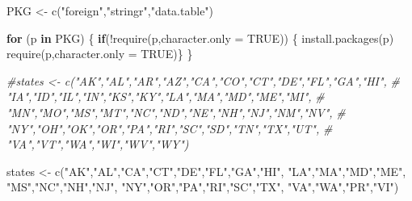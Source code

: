 \documentclass[
]{book}
\newenvironment{Shaded}{\begin{snugshade}}{\end{snugshade}}
\newcommand{\AttributeTok}[1]{\textcolor[rgb]{0.77,0.63,0.00}{#1}}
\newcommand{\CommentTok}[1]{\textcolor[rgb]{0.56,0.35,0.01}{\textit{#1}}}
\newcommand{\ConstantTok}[1]{\textcolor[rgb]{0.00,0.00,0.00}{#1}}
\newcommand{\ControlFlowTok}[1]{\textcolor[rgb]{0.13,0.29,0.53}{\textbf{#1}}}
\newcommand{\FunctionTok}[1]{\textcolor[rgb]{0.00,0.00,0.00}{#1}}
\newcommand{\NormalTok}[1]{#1}
\newcommand{\OtherTok}[1]{\textcolor[rgb]{0.56,0.35,0.01}{#1}}
\newcommand{\SpecialCharTok}[1]{\textcolor[rgb]{0.00,0.00,0.00}{#1}}
\newcommand{\StringTok}[1]{\textcolor[rgb]{0.31,0.60,0.02}{#1}}
\begin{document}
\begin{Shaded}
\begin{Highlighting}[]
\NormalTok{PKG }\OtherTok{\textless{}{-}} \FunctionTok{c}\NormalTok{(}\StringTok{"foreign"}\NormalTok{,}\StringTok{"stringr"}\NormalTok{,}\StringTok{"data.table"}\NormalTok{)}

\ControlFlowTok{for}\NormalTok{ (p }\ControlFlowTok{in}\NormalTok{ PKG) \{}
  \ControlFlowTok{if}\NormalTok{(}\SpecialCharTok{!}\FunctionTok{require}\NormalTok{(p,}\AttributeTok{character.only =} \ConstantTok{TRUE}\NormalTok{)) \{  }
    \FunctionTok{install.packages}\NormalTok{(p)}
    \FunctionTok{require}\NormalTok{(p,}\AttributeTok{character.only =} \ConstantTok{TRUE}\NormalTok{)\}}
\NormalTok{\}}

\CommentTok{\#states \textless{}{-} c("AK","AL","AR","AZ","CA","CO","CT","DE","FL","GA","HI",}
\CommentTok{\#            "IA","ID","IL","IN","KS","KY","LA","MA","MD","ME","MI",}
\CommentTok{\#            "MN","MO","MS","MT","NC","ND","NE","NH","NJ","NM","NV",}
\CommentTok{\#            "NY","OH","OK","OR","PA","RI","SC","SD","TN","TX","UT",}
\CommentTok{\#           "VA","VT","WA","WI","WV","WY")}

\NormalTok{states }\OtherTok{\textless{}{-}} \FunctionTok{c}\NormalTok{(}\StringTok{"AK"}\NormalTok{,}\StringTok{"AL"}\NormalTok{,}\StringTok{"CA"}\NormalTok{,}\StringTok{"CT"}\NormalTok{,}\StringTok{"DE"}\NormalTok{,}\StringTok{"FL"}\NormalTok{,}\StringTok{"GA"}\NormalTok{,}\StringTok{"HI"}\NormalTok{,}
            \StringTok{"LA"}\NormalTok{,}\StringTok{"MA"}\NormalTok{,}\StringTok{"MD"}\NormalTok{,}\StringTok{"ME"}\NormalTok{,}
            \StringTok{"MS"}\NormalTok{,}\StringTok{"NC"}\NormalTok{,}\StringTok{"NH"}\NormalTok{,}\StringTok{"NJ"}\NormalTok{,}
            \StringTok{"NY"}\NormalTok{,}\StringTok{"OR"}\NormalTok{,}\StringTok{"PA"}\NormalTok{,}\StringTok{"RI"}\NormalTok{,}\StringTok{"SC"}\NormalTok{,}\StringTok{"TX"}\NormalTok{,}
            \StringTok{"VA"}\NormalTok{,}\StringTok{"WA"}\NormalTok{,}\StringTok{"PR"}\NormalTok{,}\StringTok{"VI"}\NormalTok{)}


\end{Highlighting}
\end{Shaded}
\end{document}

